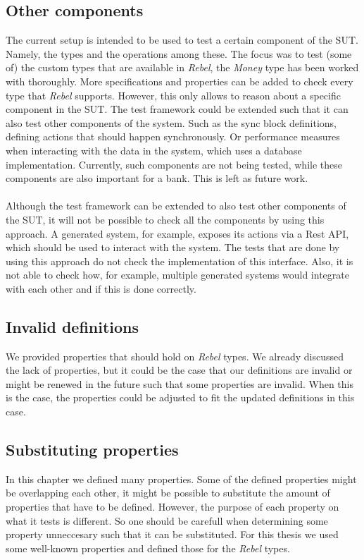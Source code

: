 \subsection*{Other components}
The current setup is intended to be used to test a certain component of the SUT. Namely, the types and the operations among these. The focus was to test (some of) the custom types that are available in \textit{Rebel}, the \textit{Money} type has been worked with thoroughly. More specifications and properties can be added to check every type that \textit{Rebel} supports. However, this only allows to reason about a specific component in the SUT. The test framework could be extended such that it can also test other components of the system. Such as the sync block definitions, defining actions that should happen synchronously. Or performance measures when interacting with the data in the system, which uses a database implementation. Currently, such components are not being tested, while these components are also important for a bank. This is left as future work.\\
\\
Although the test framework can be extended to also test other components of the SUT, it will not be possible to check all the components by using this approach. A generated system, for example, exposes its actions via a Rest API, which should be used to interact with the system. The tests that are done by using this approach do not check the implementation of this interface. Also, it is not able to check how, for example, multiple generated systems would integrate with each other and if this is done correctly.

\subsection*{Invalid definitions}
We provided properties that should hold on \textit{Rebel} types. We already discussed the lack of properties, but it could be the case that our definitions are invalid or might be renewed in the future such that some properties are invalid. When this is the case, the properties could be adjusted to fit the updated definitions in this case.

\subsection*{Substituting properties}
In this chapter we defined many properties. Some of the defined properties might be overlapping each other, it might be possible to substitute the amount of properties that have to be defined. However, the purpose of each property on what it tests is different. So one should be carefull when determining some property unneccesary such that it can be substituted. For this thesis we used some well-known properties and defined those for the \textit{Rebel} types.
